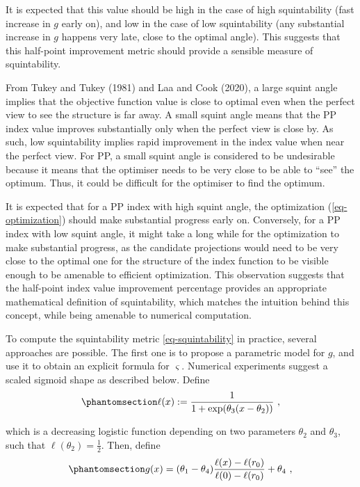 \documentclass[
  12pt,
]{interact}
\theoremstyle{plain}
\begin{document}
It is expected that this value should be high in the case of high
squintability (fast increase in \(g\) early on), and low in the case of
low squintability (any substantial increase in \(g\) happens very late,
close to the optimal angle). This suggests that this half-point
improvement metric should provide a sensible measure of squintability.

From Tukey and Tukey (1981) and Laa and Cook (2020), a large squint
angle implies that the objective function value is close to optimal even
when the perfect view to see the structure is far away. A small squint
angle means that the PP index value improves substantially only when the
perfect view is close by. As such, low squintability implies rapid
improvement in the index value when near the perfect view. For PP, a
small squint angle is considered to be undesirable because it means that
the optimiser needs to be very close to be able to ``see'' the optimum.
Thus, it could be difficult for the optimiser to find the optimum.

It is expected that for a PP index with high squint angle, the
optimization (\ref{eq-optimization}) should make substantial progress
early on. Conversely, for a PP index with low squint angle, it might
take a long while for the optimization to make substantial progress, as
the candidate projections would need to be very close to the optimal one
for the structure of the index function to be visible enough to be
amenable to efficient optimization. This observation suggests that the
half-point index value improvement percentage provides an appropriate
mathematical definition of squintability, which matches the intuition
behind this concept, while being amenable to numerical computation.

To compute the squintability metric \eqref{eq-squintability} in
practice, several approaches are possible. The first one is to propose a
parametric model for \(g\), and use it to obtain an explicit formula for
\(\varsigma\). Numerical experiments suggest a scaled sigmoid shape as
described below. Define
\begin{equation}\phantomsection\label{eq-logistic}{
\ell(x):=\frac{1}{1+\exp(\theta_{3}(x-\theta_{2}))}\ ,
}\end{equation}

which is a decreasing logistic function depending on two parameters
\(\theta_2\) and \(\theta_3\), such that
\(\ell(\theta_{2})=\frac{1}{2}\). Then, define
\begin{equation}\phantomsection\label{eq-parametric}{
g(x)=(\theta_{1}-\theta_{4})\frac{\ell(x)-\ell(r_0)}{\ell(0)-\ell(r_0)}+\theta_{4}\ ,
}\end{equation}
\end{document}
